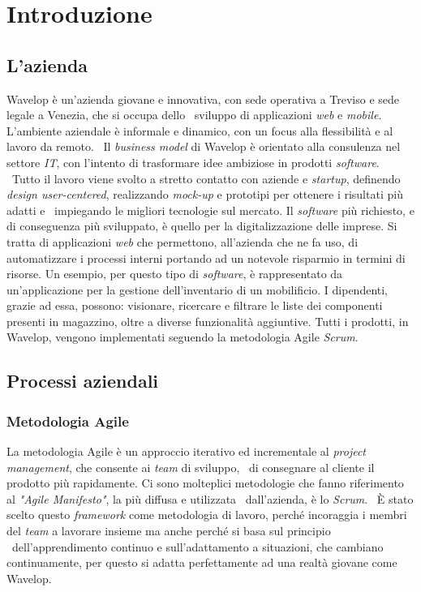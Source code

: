 
\chapter{Introduzione}
\label{cap:intro}
\section{L'azienda}
Wavelop è un'azienda giovane e innovativa, con sede operativa a Treviso e sede legale a Venezia, che si occupa dello \
sviluppo di applicazioni \emph{web} e \emph{mobile}. L'ambiente aziendale è informale e dinamico, con un focus alla flessibilità e al lavoro da remoto. \
Il \emph{business model} di Wavelop è orientato alla consulenza nel settore \emph{IT}, con l'intento di trasformare idee ambiziose in prodotti \emph{software}. \
Tutto il lavoro viene svolto a stretto contatto con aziende e \emph{startup}, definendo \emph{design user-centered}, realizzando \emph{\gls{mock-up}} e prototipi per ottenere i risultati più adatti e \
impiegando le migliori tecnologie sul mercato.
Il \emph{software} più richiesto, e di conseguenza più sviluppato, è quello per la digitalizzazione delle imprese. 
Si tratta di applicazioni \emph{web} che permettono, all'azienda che ne fa uso, di automatizzare i processi interni portando ad un notevole risparmio in termini di risorse.
Un esempio, per questo tipo di \emph{software}, è rappresentato da un'applicazione per la gestione dell'inventario di un mobilificio.
I dipendenti, grazie ad essa, possono: visionare, ricercare e filtrare le liste dei componenti presenti in magazzino, oltre a diverse funzionalità aggiuntive.
Tutti i prodotti, in Wavelop, vengono implementati seguendo la metodologia Agile \emph{Scrum}.

\section{Processi aziendali}

\subsection{Metodologia Agile}
La metodologia Agile è un approccio iterativo ed incrementale al \emph{project management}, che consente ai \emph{team} di sviluppo, \
di consegnare al cliente il prodotto più rapidamente. Ci sono molteplici metodologie che fanno riferimento al \emph{"Agile Manifesto"}, la più diffusa e utilizzata \
dall'azienda, è lo \emph{Scrum}. \
È stato scelto questo \emph{framework} come metodologia di lavoro, perché incoraggia i membri del \emph{team} a lavorare insieme ma anche perché si basa sul principio \
dell'apprendimento continuo e sull'adattamento a situazioni, che cambiano continuamente, per questo si adatta perfettamente ad una realtà giovane come Wavelop. \\

